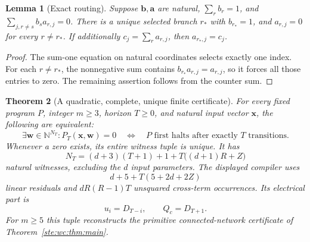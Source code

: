 \documentclass[11pt,letterpaper]{article}
\newtheorem{theorem}{Theorem}[section]
\newtheorem{lemma}[theorem]{Lemma}
\theoremstyle{definition}
\theoremstyle{remark}
\newcommand{\N}{\mathbb N}
\begin{document}
\begin{lemma}[Exact routing]\label{ste:wc:lem:routing}
Suppose $\bm b,\bm a$ are natural, $\sum_r b_r=1$, and
$\sum_{j,r\ne s}b_s a_{r,j}=0$. There is a unique selected branch $r_*$
with $b_{r_*}=1$, and $a_{r,j}=0$ for every $r\ne r_*$. If additionally
$c_j=\sum_r a_{r,j}$, then $a_{r_*,j}=c_j$.
\end{lemma}
\begin{proof}
The sum-one equation on natural coordinates selects exactly one index.
For each $r\ne r_*$, the nonnegative sum contains
$b_{r_*}a_{r,j}=a_{r,j}$, so it forces all those entries to zero.
The remaining assertion follows from the counter sum.
\end{proof}

\begin{theorem}[A quadratic, complete, unique finite certificate]
\label{ste:wc:thm:quadratic}
For every fixed program $P$, integer $m\geq3$, horizon $T\geq0$, and
natural input vector $\bm x$, the following are equivalent:
\begin{equation}\label{ste:wc:eq:quadraticiff}
 \exists\bm w\in\N^{N_T}: P_T(\bm x,\bm w)=0
 \quad\Longleftrightarrow\quad
 P\text{ first halts after exactly }T\text{ transitions}.
\end{equation}
Whenever a zero exists, its \emph{entire} witness tuple is unique. It has
\begin{equation}\label{ste:wc:eq:quadcounts}
 N_T=(d+3)(T+1)+1+T\bigl((d+1)R+Z\bigr)
\end{equation}
natural witnesses, excluding the $d$ input parameters. The displayed
compiler uses
\begin{equation}\label{ste:wc:eq:rescounts}
 d+5+T(5+2d+2Z)
\end{equation}
linear residuals and $dR(R-1)T$ unsquared cross-term occurrences.
Its electrical part is
\begin{equation}\label{ste:wc:eq:canonicalelectrical}
 u_i=D_{T-i},\qquad Q_c=D_{T+1}.
\end{equation}
For $m\geq5$ this tuple reconstructs the primitive connected-network
certificate of Theorem~\ref{ste:wc:thm:main}.
\end{theorem}
\end{document}
